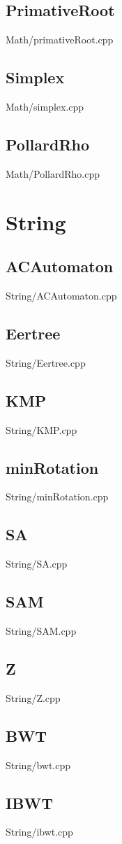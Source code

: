     \subsection{PrimativeRoot}
         {Math/primativeRoot.cpp}
    \subsection{Simplex}
         {Math/simplex.cpp}
    \subsection{PollardRho}
         {Math/PollardRho.cpp}

\section{String}
    \subsection{ACAutomaton}
         {String/ACAutomaton.cpp}
    \subsection{Eertree}
         {String/Eertree.cpp}
    \subsection{KMP}
         {String/KMP.cpp}
    \subsection{minRotation}
         {String/minRotation.cpp}
    \subsection{SA}
         {String/SA.cpp}
    \subsection{SAM}
         {String/SAM.cpp}
    \subsection{Z}
         {String/Z.cpp}
    \subsection{BWT}
         {String/bwt.cpp}
    \subsection{IBWT}
         {String/ibwt.cpp}
